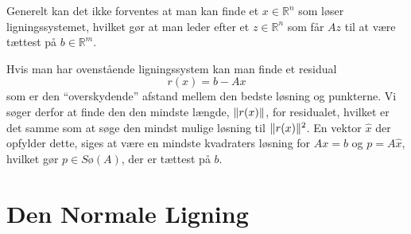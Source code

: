 Generelt kan det ikke forventes at man kan finde et $x \in \mathbb{R}^n$ som
løser ligningssystemet, hvilket gør at man leder efter et $z \in \mathbb{R}^n$
som får $Az$ til at være tættest på $b \in \mathbb{R}^m$.



Hvis man har ovenstående ligningssystem kan man finde et residual
\[
	r(x) = b - Ax
\]
som er den ``overskydende'' afstand mellem den bedste løsning og punkterne. Vi
søger derfor at finde den den mindste længde, $\lVert r(x)\rVert$, for residualet, hvilket
er det samme som at søge den mindst mulige løsning til $\lVert r(x)\rVert^2$. En vektor
$\hat{x}$ der opfylder dette, siges at være en mindste kvadraters løsning for
$Ax = b$ og $p = A\hat{x}$, hvilket gør $p \in S\text{ø}(A)$, der er tættest på
$b$.



\section{Den Normale Ligning}


